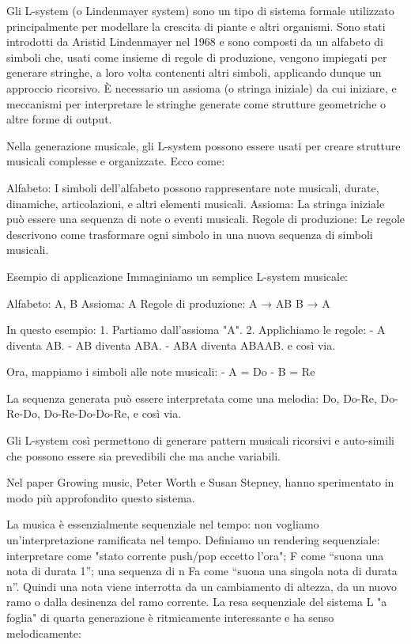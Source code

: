 \documentclass[a4paper,12pt]{report}
\begin{document}
Gli L-system (o Lindenmayer system) sono un tipo di sistema formale utilizzato principalmente per modellare la crescita di piante e altri organismi. 
Sono stati introdotti da Aristid Lindenmayer nel 1968 e sono composti da un alfabeto di simboli che, usati come insieme di regole di produzione, vengono impiegati per generare stringhe, a loro volta contenenti altri simboli, applicando dunque un approccio ricorsivo.
È necessario un assioma (o stringa iniziale) da cui iniziare, e meccanismi per interpretare le stringhe generate come strutture geometriche o altre forme di output.

Nella generazione musicale, gli L-system possono essere usati per creare strutture musicali complesse e organizzate. Ecco come:

Alfabeto: I simboli dell'alfabeto possono rappresentare note musicali, durate, dinamiche, articolazioni, e altri elementi musicali.
Assioma: La stringa iniziale può essere una sequenza di note o eventi musicali.
Regole di produzione: Le regole descrivono come trasformare ogni simbolo in una nuova sequenza di simboli musicali.

Esempio di applicazione
Immaginiamo un semplice L-system musicale:

Alfabeto: {A, B}
Assioma: A
Regole di produzione: 
  A → AB
  B → A

In questo esempio:
1. Partiamo dall'assioma "A".
2. Applichiamo le regole:
   - A diventa AB.
   - AB diventa ABA.
   - ABA diventa ABAAB.
   e così via.

Ora, mappiamo i simboli alle note musicali:
- A = Do
- B = Re

La sequenza generata può essere interpretata come una melodia: Do, Do-Re, Do-Re-Do, Do-Re-Do-Do-Re, e così via.

Gli L-system così permettono di generare pattern musicali ricorsivi e auto-simili che possono essere sia prevedibili che ma anche variabili. 

Nel paper Growing music, Peter Worth e Susan Stepney, hanno sperimentato in modo più approfondito questo sistema.

La musica è essenzialmente sequenziale nel tempo: non vogliamo un'interpretazione ramificata nel tempo. 
Definiamo un rendering sequenziale: interpretare  come "stato corrente push/pop eccetto l'ora"; 
F come “suona una nota di durata 1”; 
una sequenza di n Fa come “suona una singola nota di durata n”. 
Quindi una nota viene interrotta da un cambiamento di altezza, da un nuovo ramo o dalla desinenza del ramo corrente. 
La resa sequenziale del sistema L "a foglia" di quarta generazione è ritmicamente interessante e ha senso melodicamente:
\end{document}
